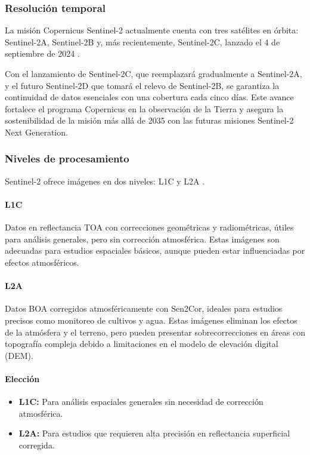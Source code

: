         \subsubsection{Resolución temporal}

            La misión Copernicus Sentinel-2 actualmente cuenta con tres satélites en órbita: Sentinel-2A, Sentinel-2B y, más recientemente, Sentinel-2C, lanzado el 4 de septiembre de 2024 \autocite{Sentinel2C_Copernicus_2024}. 
            
            Con el lanzamiento de Sentinel-2C, que reemplazará gradualmente a Sentinel-2A, y el futuro Sentinel-2D que tomará el relevo de Sentinel-2B, se garantiza la continuidad de datos esenciales con una cobertura cada cinco días. Este avance fortalece el programa Copernicus en la observación de la Tierra y asegura la sostenibilidad de la misión más allá de 2035 con las futuras misiones Sentinel-2 Next Generation.

        \subsubsection{Niveles de procesamiento}

            Sentinel-2 ofrece imágenes en dos niveles: L1C y L2A \autocite{ginting2024comparison}.
            
            \paragraph{L1C}
            Datos en reflectancia TOA con correcciones geométricas y radiométricas, útiles para análisis generales, pero sin corrección atmosférica. Estas imágenes son adecuadas para estudios espaciales básicos, aunque pueden estar influenciadas por efectos atmosféricos.
            
            \paragraph{L2A}
            Datos BOA corregidos atmosféricamente con Sen2Cor, ideales para estudios precisos como monitoreo de cultivos y agua. Estas imágenes eliminan los efectos de la atmósfera y el terreno, pero pueden presentar sobrecorrecciones en áreas con topografía compleja debido a limitaciones en el modelo de elevación digital (DEM).
            
            \paragraph{Elección}
            \begin{itemize}
                \item \textbf{L1C:} Para análisis espaciales generales sin necesidad de corrección atmosférica.
                \item \textbf{L2A:} Para estudios que requieren alta precisión en reflectancia superficial corregida.
            \end{itemize}
            
